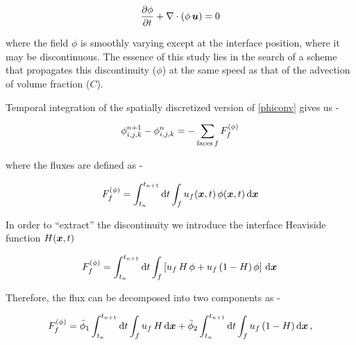 \begin{align}
	\frac{\partial \phi}{\partial t} + \nabla \cdot \left( \phi \, \boldsymbol{u} \right)  = 0 
\label{phiconv}
\end{align}


where the field $\phi$ is smoothly varying except 
at the interface position, where it may be discontinuous.
The essence of this study lies in the search of a scheme that  
propagates this discontinuity ($\phi$) at the same speed as 
that of the advection of volume fraction ($C$).


Temporal integration of the spatially discretized version of \eqref{phiconv} gives us - 

\begin{align}
\phi_{i,j,k}^{n+1} - \phi_{i,j,k}^{n} = - \sum_{\textrm{faces}\, f} F^{(\phi)}_f 
\label{sumfp}
\end{align}



where the fluxes are defined as -

\begin{align}
	F_f^{(\phi)} = \int_{t_n}^{t_{n+1}} {\textrm {d}}t \int_{f} u_f(\boldsymbol{x},t) \,\phi(\boldsymbol{x},t) \,
	{\textrm {d}}\boldsymbol{x}
\label{pfaceint}
\end{align}

In order to ``extract'' the discontinuity we introduce the 
 interface Heaviside function $ H(\boldsymbol{x},t) $

\begin{align}
F_f^{(\phi)} = 
\int_{t_n}^{t_{n+1}} {\textrm d}t \int_{f} \left[ u_f  \,H \,\phi  +  u_f \,(1-H) \,\phi \right] 
\, {\textrm d}\boldsymbol{x} \, 
\label{fluxphi}
\end{align}

Therefore, the flux can be decomposed into two components as -

\begin{align}
F_f^{(\phi)} = 
\bar \phi_1 \int_{t_n}^{t_{n+1}} {\textrm d}t \int_{f} u_f \,H \,{\textrm d}\boldsymbol{x} + 
\bar \phi_2 \int_{t_n}^{t_{n+1}} {\textrm d}t \int_{f} u_f \,(1-H) \,{\textrm d}\boldsymbol{x} \,,
\label{barphi}
\end{align}


